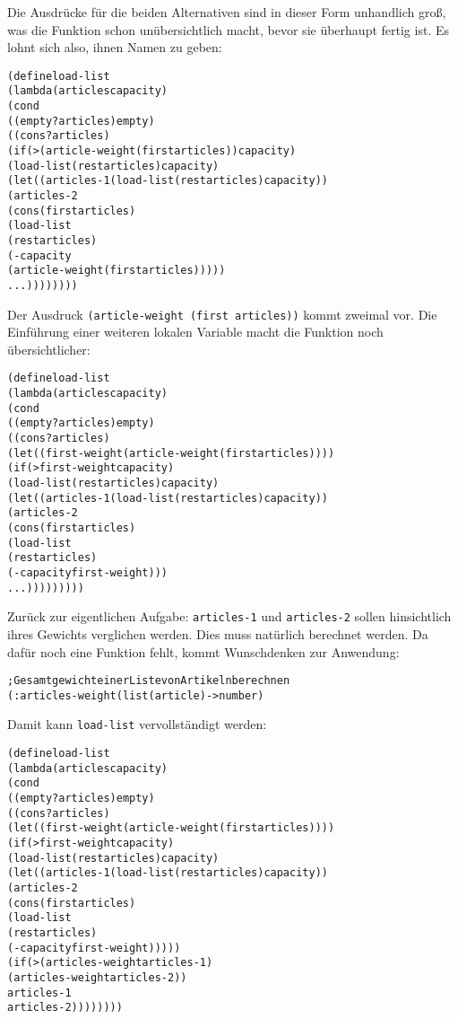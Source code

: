 %
Die Ausdrücke für die beiden Alternativen sind in dieser Form 
unhandlich groß, was die Funktion schon unübersichtlich macht, bevor
sie überhaupt fertig ist.
Es lohnt sich also, ihnen Namen zu geben:
%
\begin{alltt}
(define load-list
  (lambda (articles capacity)
    (cond
     ((empty? articles) empty)
     ((cons? articles)
        (if (> (article-weight (first articles)) capacity)
            (load-list (rest articles) capacity)
            (let ((articles-1 (load-list (rest articles) capacity))
                  (articles-2
                    (cons (first articles)
                               (load-list
                                 (rest articles)
                                 (- capacity 
                                    (article-weight (first articles)))))
              ...))))))))
\end{alltt}
%
Der Ausdruck
\texttt{(article-weight (first articles))} kommt zweimal vor.  Die Einführung einer
weiteren lokalen Variable macht die Funktion noch übersichtlicher:
%
\begin{alltt}
(define load-list
  (lambda (articles capacity)
    (cond
     ((empty? articles) empty)
     ((cons? articles)
      (let ((first-weight (article-weight (first articles))))
        (if (> first-weight capacity)
            (load-list (rest articles) capacity)
            (let ((articles-1 (load-list (rest articles) capacity))
                  (articles-2
                    (cons (first articles)
                               (load-list
                                 (rest articles)
                                 (- capacity first-weight)))
              ...)))))))))
\end{alltt}
%
Zurück zur eigentlichen Aufgabe: \texttt{articles-1} und
\texttt{articles-2} sollen hinsichtlich ihres Gewichts verglichen werden.
Dies muss natürlich berechnet werden.  Da dafür noch eine Funktion
fehlt, kommt Wunschdenken zur Anwendung:
%
\begin{alltt}
; Gesamtgewicht einer Liste von Artikeln berechnen
(: articles-weight (list(article) -> number)
\end{alltt}
% 
Damit kann \texttt{load-list} vervollständigt werden:
%
\begin{alltt}
(define load-list
  (lambda (articles capacity)
    (cond
     ((empty? articles) empty)
     ((cons? articles)
      (let ((first-weight (article-weight (first articles))))
        (if (> first-weight capacity)
            (load-list (rest articles) capacity)
            (let ((articles-1 (load-list (rest articles) capacity))
                  (articles-2
                   (cons (first articles)
                              (load-list
                                (rest articles) 
                                (- capacity first-weight)))))
              (if (> (articles-weight articles-1)
                     (articles-weight articles-2))
                  articles-1
                  articles-2))))))))
\end{alltt}
